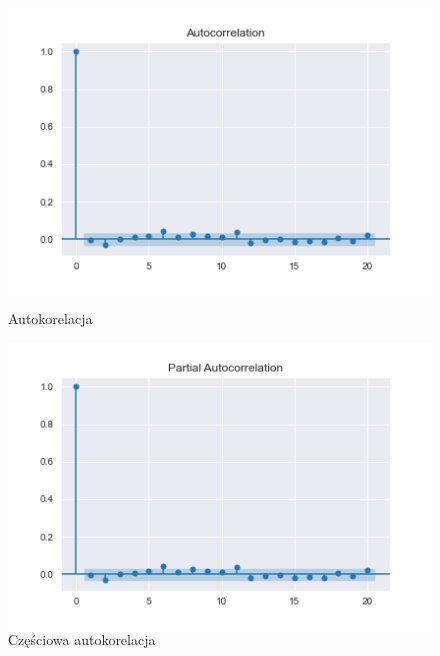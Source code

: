 \documentclass{article}
\theoremstyle{break}
\begin{document}
	\begin{figure}[H]
		\begin{center}
			\begin{minipage}{0.49\linewidth}
				\centering
				\includegraphics[scale=0.49]{acf_res.png}
				\caption{Autokorelacja}
				\label{fig:acf_res}
			\end{minipage}
			\begin{minipage}{0.49\linewidth}
				\centering
				\includegraphics[scale=0.49]{pacf_res.png}
				\caption{Częściowa autokorelacja}
				\label{fig:pacf_res}
			\end{minipage}
		\end{center}
	\end{figure}
	
\end{document}
